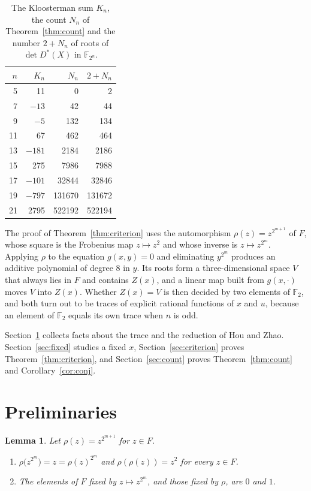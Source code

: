 \documentclass[11pt]{amsart}
\newtheorem{lemma}[theorem]{Lemma}
\theoremstyle{definition}
\theoremstyle{remark}
\numberwithin{equation}{section}
\newcommand{\F}{\mathbb{F}}
\begin{document}
\begin{table}[ht]
\caption{The Kloosterman sum $K_n$, the count $N_n$ of Theorem~\ref{thm:count} and the number $2+N_n$ of roots of $\det D^*(X)$ in $\F_{2^n}$.}\label{tab}
\centering
\begin{tabular}{rrrr}
\toprule
$n$ & $K_n$ & $N_n$ & $2+N_n$\\
\midrule
5 & 11 & 0 & 2\\
7 & $-13$ & 42 & 44\\
9 & $-5$ & 132 & 134\\
11 & 67 & 462 & 464\\
13 & $-181$ & 2184 & 2186\\
15 & 275 & 7986 & 7988\\
17 & $-101$ & 32844 & 32846\\
19 & $-797$ & 131670 & 131672\\
21 & 2795 & 522192 & 522194\\
\bottomrule
\end{tabular}
\end{table}

The proof of Theorem~\ref{thm:criterion} uses the automorphism $\rho(z)=z^{2^{m+1}}$ of $F$, whose square is the Frobenius map $z\mapsto z^2$ and whose inverse is $z\mapsto z^{2^m}$. Applying $\rho$ to the equation $g(x,y)=0$ and eliminating $y^{2^m}$ produces an additive polynomial of degree $8$ in $y$. Its roots form a three-dimensional space $V$ that always lies in $F$ and contains $Z(x)$, and a linear map built from $g(x,\cdot)$ moves $V$ into $Z(x)$. Whether $Z(x)=V$ is then decided by two elements of $\F_2$, and both turn out to be traces of explicit rational functions of $x$ and $u$, because an element of $\F_2$ equals its own trace when $n$ is odd.

Section~\ref{sec:prelim} collects facts about the trace and the reduction of Hou and Zhao. Section~\ref{sec:fixed} studies a fixed $x$, Section~\ref{sec:criterion} proves Theorem~\ref{thm:criterion}, and Section~\ref{sec:count} proves Theorem~\ref{thm:count} and Corollary~\ref{cor:conj}.

\section{Preliminaries}\label{sec:prelim}

\begin{lemma}\label{lem:frob}
Let $\rho(z)=z^{2^{m+1}}$ for $z\in F$.
\begin{enumerate}
\item[(a)] $\rho\bigl(z^{2^m}\bigr)=z=\rho(z)^{2^m}$ and $\rho(\rho(z))=z^2$ for every $z\in F$.
\item[(b)] The elements of $F$ fixed by $z\mapsto z^{2^m}$, and those fixed by $\rho$, are $0$ and $1$.
\end{enumerate}
\end{lemma}
\end{document}

